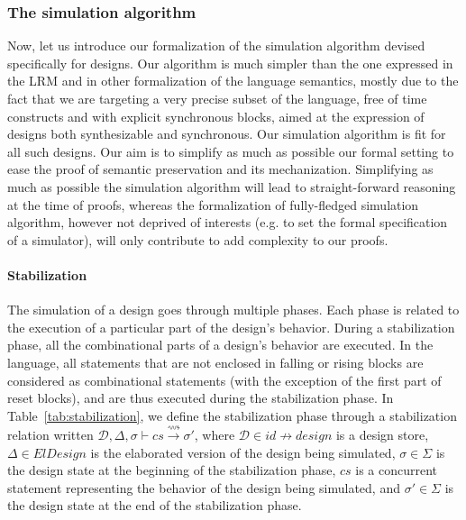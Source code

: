 \subsubsection{The simulation algorithm}
\label{subsubsec:sim-algo}

Now, let us introduce our formalization of the simulation algorithm
devised specifically for \hvhdl{} designs. Our algorithm is much
simpler than the one expressed in the \vhdl{} LRM\cite{VHDL2000} and
in other formalization of the \vhdl{} language
semantics\cite{Borger1995}, mostly due to the fact that we are
targeting a very precise subset of the language, free of time
constructs and with explicit synchronous blocks, aimed at the
expression of designs both synthesizable and synchronous. Our
simulation algorithm is fit for all such designs. Our aim is to
simplify as much as possible our formal setting to ease the proof of
semantic preservation and its mechanization. Simplifying as much as
possible the simulation algorithm will lead to straight-forward
reasoning at the time of proofs, whereas the formalization of
fully-fledged simulation algorithm, however not deprived of interests
(e.g. to set the formal specification of a \vhdl{} simulator), will
only contribute to add complexity to our proofs.

\paragraph{Stabilization}

The simulation of a \hvhdl{} design goes through multiple phases. Each
phase is related to the execution of a particular part of the design's
behavior. During a stabilization phase, all the combinational parts of
a design's behavior are executed. In the \hvhdl{} language, all
statements that are not enclosed in falling or rising blocks are
considered as combinational statements (with the exception of the
first part of reset blocks), and are thus executed during the
stabilization phase. In Table~\ref{tab:stabilization}, we define the
stabilization phase through a stabilization relation written
$\mathcal{D},\Delta,\sigma\vdash{}cs\xrightarrow{\rightsquigarrow}\sigma'$,
where $\mathcal{D}\in{}id\nrightarrow{}design$ is a design store,
$\Delta\in{}ElDesign$ is the elaborated version of the design being
simulated, $\sigma\in{}\Sigma$ is the design state at the beginning of
the stabilization phase, $cs$ is a concurrent statement representing
the behavior of the design being simulated, and $\sigma'\in\Sigma$ is
the design state at the end of the stabilization phase.


